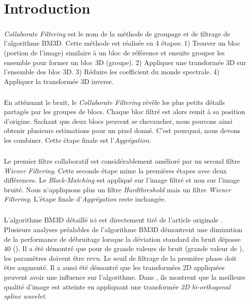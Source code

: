 
\chapter{Introduction}
\paragraph{}
\textit{Collaborate Filtering} est le nom de la méthode de groupage et de filtrage de l'algorithme BM3D. Cette méthode est réalisée en 4 étapes: 1) Trouver un bloc (portion de l'image) similaire à un bloc de référence et ensuite grouper les ensemble pour former un bloc 3D (groupe). 2) Appliquer une transformée 3D sur l'ensemble des bloc 3D. 3) Réduire les coefficient du monde spectrale. 4) Appliquer la transformée 3D inverse. 
\paragraph{}
En atténuant le bruit, le \textit{Collaborate Filtering} révèle les plus petits détails partagés par les groupes de blocs. Chaque bloc filtré est alors remit à sa position d'origine. Sachant que deux blocs peuvent se chevaucher, nous pouvons ainsi obtenir plusieurs estimations pour un pixel donné. C'est pourquoi, nous devons les combiner. Cette étape finale est l'\textit{Aggrégation}.
\paragraph{}
Le premier filtre collaboratif est considérablement amélioré par un second filtre \textit{Wiener Filtering}. Cette seconde étape mime la premières étapes avec deux différences. Le \textit{Block-Matching} est appliqué sur l'image filtré et non sur l'image bruité. Nous n'appliquons plus un filtre \textit{Hardthreshold} mais un filtre \textit{Wiener Filtering}. L'étape finale d'\textit{Aggrégation} reste inchangée.
\paragraph{}
L'algorithme BM3D détaillé ici est directement tiré de l'article originale \cite{1}. Plusieurs analyses préalables de l'algorithme BM3D démontrent une diminution de la performance de débruitage lorsque la déviation standard du bruit dépasse 40 (\sigma). Il a été démontré que pour de grande valeurs de bruit (grande valeur de \sigma), les paramètres doivent être revu. Le seuil de filtrage de la première phase doit être augmenté. Il a aussi été démontré que les transformées 2D appliquées peuvent avoir une influence sur l'algorithme. Dans \cite{2}, ils montrent que la meilleurs qualité d'image est atteinte en appliquant une transformée \textit{2D bi-orthogonal spline wavelet}. 

